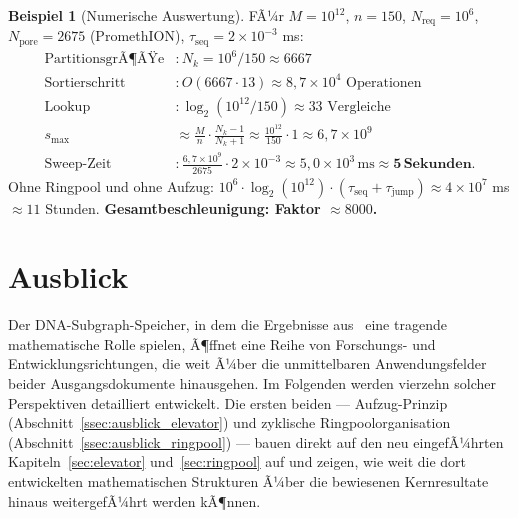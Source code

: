 ﻿\documentclass[a4paper,12pt]{article}
\theoremstyle{definition}
\newtheorem{beispiel}{Beispiel}[section]
\theoremstyle{plain}
\begin{document}
\begin{beispiel}[Numerische Auswertung]
  FÃ¼r $M = 10^{12}$, $n = 150$, $N_{\mathrm{req}} = 10^6$,
  $N_{\mathrm{pore}} = 2675$ (PromethION), $\tau_{\mathrm{seq}} = 2 \times 10^{-3}$ ms:
  \begin{align*}
    \text{PartitionsgrÃ¶ÃŸe} &: N_k = 10^6 / 150 \approx 6667 \\
    \text{Sortierschritt} &: O(6667 \cdot 13) \approx 8{,}7 \times 10^4
      \text{ Operationen} \\
    \text{Lookup} &: \log_2(10^{12}/150) \approx 33 \text{ Vergleiche} \\
    s_{\max} &\approx \frac{M}{n} \cdot \frac{N_k-1}{N_k+1}
      \approx \frac{10^{12}}{150} \cdot 1 \approx 6{,}7 \times 10^9 \\
    \text{Sweep-Zeit} &: \frac{6{,}7 \times 10^9}{2675} \cdot 2 \times 10^{-3}
      \approx 5{,}0 \times 10^3\,\text{ms} \approx \mathbf{5\,\text{Sekunden}}.
  \end{align*}
  Ohne Ringpool und ohne Aufzug: $10^6 \cdot \log_2(10^{12}) \cdot
  (\tau_{\mathrm{seq}} + \tau_{\mathrm{jump}}) \approx 4 \times 10^7$ ms
  $\approx 11$ Stunden.
  \textbf{Gesamtbeschleunigung: Faktor $\approx 8000$.}
\end{beispiel}

\section{Ausblick}
\label{sec:ausblick}

Der DNA-Subgraph-Speicher, in dem die Ergebnisse aus~\cite{dusgraph}
eine tragende mathematische Rolle spielen, Ã¶ffnet eine Reihe von
Forschungs- und Entwicklungsrichtungen, die weit Ã¼ber die unmittelbaren
Anwendungsfelder beider Ausgangsdokumente hinausgehen.  Im Folgenden
werden vierzehn solcher Perspektiven detailliert entwickelt.  Die ersten
beiden --- Aufzug-Prinzip (Abschnitt~\ref{ssec:ausblick_elevator}) und
zyklische Ringpoolorganisation (Abschnitt~\ref{ssec:ausblick_ringpool})
--- bauen direkt auf den neu eingefÃ¼hrten Kapiteln~\ref{sec:elevator}
und~\ref{sec:ringpool} auf und zeigen, wie weit die dort entwickelten
mathematischen Strukturen Ã¼ber die bewiesenen Kernresultate hinaus
weitergefÃ¼hrt werden kÃ¶nnen.

\end{document}
